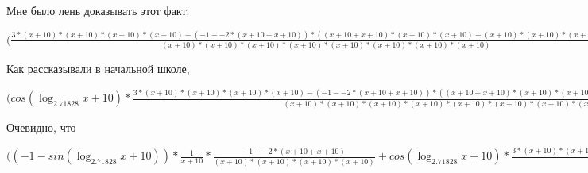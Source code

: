 \documentclass[12pt,a4paper,fleqn]{article}
\theoremstyle{definition}
\begin{document}
Мне было лень доказывать этот факт.

$(\frac{ 3  * ( x  +  10 ) * ( x  +  10 ) * ( x  +  10 ) * ( x  +  10 ) - ( -1  -  -2  * ( x  +  10  +  x  +  10 )) * (( x  +  10  +  x  +  10 ) * ( x  +  10 ) * ( x  +  10 ) + ( x  +  10 ) * ( x  +  10 ) * ( x  +  10  +  x  +  10 ))}{( x  +  10 ) * ( x  +  10 ) * ( x  +  10 ) * ( x  +  10 ) * ( x  +  10 ) * ( x  +  10 ) * ( x  +  10 ) * ( x  +  10 )}
 = \frac{ 3  * ( x  +  10 ) * ( x  +  10 ) * ( x  +  10 ) * ( x  +  10 ) - ( -1  -  -2  * ( x  +  10  +  x  +  10 )) * (( x  +  10  +  x  +  10 ) * ( x  +  10 ) * ( x  +  10 ) + ( x  +  10 ) * ( x  +  10 ) * ( x  +  10  +  x  +  10 ))}{( x  +  10 ) * ( x  +  10 ) * ( x  +  10 ) * ( x  +  10 ) * ( x  +  10 ) * ( x  +  10 ) * ( x  +  10 ) * ( x  +  10 )}
$

Как рассказывали в начальной школе,

$(cos(\log_{ 2.71828 }{ x  +  10 }) * \frac{ 3  * ( x  +  10 ) * ( x  +  10 ) * ( x  +  10 ) * ( x  +  10 ) - ( -1  -  -2  * ( x  +  10  +  x  +  10 )) * (( x  +  10  +  x  +  10 ) * ( x  +  10 ) * ( x  +  10 ) + ( x  +  10 ) * ( x  +  10 ) * ( x  +  10  +  x  +  10 ))}{( x  +  10 ) * ( x  +  10 ) * ( x  +  10 ) * ( x  +  10 ) * ( x  +  10 ) * ( x  +  10 ) * ( x  +  10 ) * ( x  +  10 )}
 = cos(\log_{ 2.71828 }{ x  +  10 }) * \frac{ 3  * ( x  +  10 ) * ( x  +  10 ) * ( x  +  10 ) * ( x  +  10 ) - ( -1  -  -2  * ( x  +  10  +  x  +  10 )) * (( x  +  10  +  x  +  10 ) * ( x  +  10 ) * ( x  +  10 ) + ( x  +  10 ) * ( x  +  10 ) * ( x  +  10  +  x  +  10 ))}{( x  +  10 ) * ( x  +  10 ) * ( x  +  10 ) * ( x  +  10 ) * ( x  +  10 ) * ( x  +  10 ) * ( x  +  10 ) * ( x  +  10 )}
$

Очевидно, что

$(( -1  - sin(\log_{ 2.71828 }{ x  +  10 })) * \frac{ 1 }{ x  +  10 }
 * \frac{ -1  -  -2  * ( x  +  10  +  x  +  10 )}{( x  +  10 ) * ( x  +  10 ) * ( x  +  10 ) * ( x  +  10 )}
 + cos(\log_{ 2.71828 }{ x  +  10 }) * \frac{ 3  * ( x  +  10 ) * ( x  +  10 ) * ( x  +  10 ) * ( x  +  10 ) - ( -1  -  -2  * ( x  +  10  +  x  +  10 )) * (( x  +  10  +  x  +  10 ) * ( x  +  10 ) * ( x  +  10 ) + ( x  +  10 ) * ( x  +  10 ) * ( x  +  10  +  x  +  10 ))}{( x  +  10 ) * ( x  +  10 ) * ( x  +  10 ) * ( x  +  10 ) * ( x  +  10 ) * ( x  +  10 ) * ( x  +  10 ) * ( x  +  10 )}
 = ( -1  - sin(\log_{ 2.71828 }{ x  +  10 })) * \frac{ 1 }{ x  +  10 }
 * \frac{ -1  -  -2  * ( x  +  10  +  x  +  10 )}{( x  +  10 ) * ( x  +  10 ) * ( x  +  10 ) * ( x  +  10 )}
 + cos(\log_{ 2.71828 }{ x  +  10 }) * \frac{ 3  * ( x  +  10 ) * ( x  +  10 ) * ( x  +  10 ) * ( x  +  10 ) - ( -1  -  -2  * ( x  +  10  +  x  +  10 )) * (( x  +  10  +  x  +  10 ) * ( x  +  10 ) * ( x  +  10 ) + ( x  +  10 ) * ( x  +  10 ) * ( x  +  10  +  x  +  10 ))}{( x  +  10 ) * ( x  +  10 ) * ( x  +  10 ) * ( x  +  10 ) * ( x  +  10 ) * ( x  +  10 ) * ( x  +  10 ) * ( x  +  10 )}
$
\end{document}
